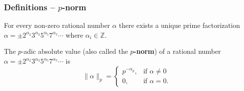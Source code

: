 \documentclass{beamer}
\begin{document}
\begin{frame}
\frametitle{Definitions -- $p$-norm}
For every non-zero rational number $\alpha$ there exists a unique prime factorization $\alpha = \pm 2^{\alpha_2}3^{\alpha_3}5^{\alpha_5}7^{\alpha_7} \cdots$ where $\alpha_i \in \mathbb{Z}$.

The $p$-adic absolute value (also called the \textbf{$p$-norm}) of a rational number $\alpha = \pm 2^{\alpha_2}3^{\alpha_3}5^{\alpha_5}7^{\alpha_7} \cdots$ is 
\[
\|\alpha\|_p = \begin{cases}
p^{-\alpha_p}, &\textrm{if } \alpha \neq 0 \\
0, &\textrm{if } \alpha = 0.
\end{cases}
\]
\end{frame}
\end{document}
